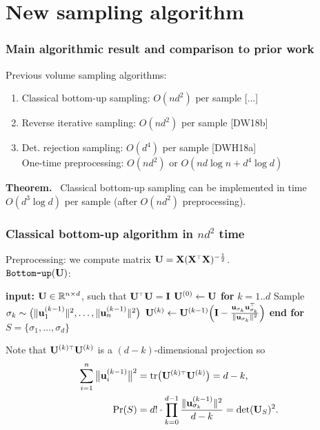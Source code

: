 \documentclass{beamer}
\begin{document}
\section{New sampling algorithm}

\begin{frame}
  \frametitle{Main algorithmic result and comparison to prior work}
  Previous volume sampling algorithms:
  \begin{enumerate}
  \item Classical bottom-up sampling: $O(nd^2)$ per sample [...]\\[2mm]
  \item Reverse iterative sampling: $O(nd^2)$ per sample [DW18b]\\[2mm]
  \item Det. rejection sampling: $O(d^4)$ per sample
    [DWH18a]\\
    One-time preprocessing: $O(nd^2)$ or $O(nd\log n + d^4\log d)$
  \end{enumerate}
  \vspace{5mm}
  
  \textbf{Theorem.} \  Classical bottom-up sampling can be implemented in
  time $O(d^3\log d)$ per sample (after $O(nd^2)$ preprocessing).
  
\end{frame}

  \begin{frame}
    \frametitle{Classical bottom-up algorithm in $nd^2$ time}
    Preprocessing: we compute matrix $\U=\X(\X^\top\X)^{-\frac12}$.\\[2mm]
    
    $\verb~Bottom-up~(\U)$:\vspace{0mm}
    
  \begin{algorithmic}[1]
    \STATE \textbf{input:} $\mathbf U\in\mathbb R^{n\times d}$, such that $\U^\top\U=\I$
    \STATE $\mathbf U^{(0)} \leftarrow \mathbf U$
    \STATE \textbf{for }$k=1..d$
    \STATE  \quad Sample $\sigma_k \sim \big(\|\mathbf u_1^{(k-1)}\|^2,\dots,\|\mathbf u_n^{(k-1)}\|^2\big)$
    \STATE \quad$\U^{(k)}\leftarrow \U^{(k-1)}\Big(\I -
    \frac{\u_{\sigma_k}\u_{\sigma_k}^\top}{\|\u_{\sigma_k}\|^2}\Big)$
    \STATE \textbf{end for}
    \RETURN $S = \{\sigma_1,\dots,\sigma_d\}$
  \end{algorithmic}
  Note that $\U^{(k) \top}\U^{(k)}$ is a $(d-k)$-dimensional projection
  so
  \begin{align*}
    \sum_{i=1}^n \big\|\u_i^{(k-1)}\big\|^2
    &= \tr\big(\U^{(k)\top}\U^{(k)}\big) = d-k,\\
\Pr(S)
&=d!\cdot\prod_{k=0}^{d-1}\frac{\|\u_{\sigma_k}^{(k-1)}\|^2}{d-k}
=\det(\U_S)^2.       
  \end{align*}
\end{frame}
\end{document}
